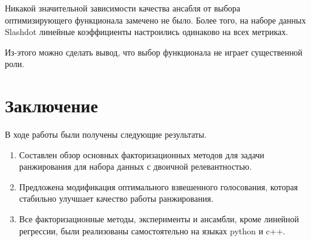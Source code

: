 \documentclass[14pt]{extarticle}
\begin{document}
Никакой значительной зависимости качества ансабля от выбора оптимизирующего функционала замечено не было. Более того, на наборе данных Slashdot линейные коэффициенты настроились одинаково на всех метриках.

Из-этого можно сделать вывод, что выбор функционала не играет существенной роли. 

\section{Заключение}
В ходе работы были получены следующие результаты.

\begin{enumerate}

\item Составлен обзор основных факторизационных методов для задачи ранжирования для набора данных с двоичной релевантностью.


\item Предложена модификация оптимального взвешенного голосования, которая стабильно улучшает качество работы ранжирования.

\item Все факторизационные методы, эксперименты и ансамбли, кроме линейной регрессии, были реализованы самостоятельно на языках python и c++.

\end{enumerate}




\newpage
\end{document}
